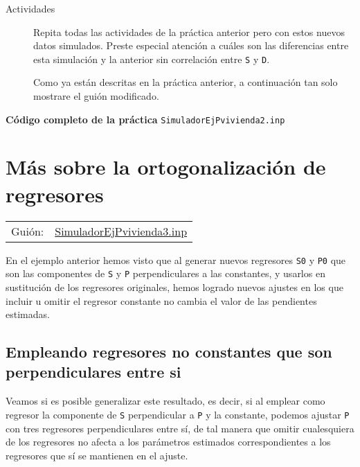 \documentclass[11pt]{article}
\begin{document}
\begin{description}
\item[{Actividades}] Repita todas las actividades de la práctica anterior pero con estos
nuevos datos simulados.  Preste especial atención a cuáles son las
diferencias entre esta simulación y la anterior sin correlación
entre \texttt{S} y \texttt{D}.

Como ya están descritas en la práctica anterior, a continuación tan solo mostrare el guión modificado.
\end{description}
\clearpage
\noindent
\textbf{Código completo de la práctica} \texttt{SimuladorEjPvivienda2.inp}
\vspace{10pt}

\clearpage


\section{Más sobre la ortogonalización de regresores}
\label{sec:org35c3827}
\begin{center}
\begin{tabular}{ll}
Guión: & \href{https://github.com/mbujosab/Ectr/tree/master/Practicas/Gretl/scripts/SimuladorEjPvivienda3.inp}{SimuladorEjPvivienda3.inp}\\[0pt]
\end{tabular}
\end{center}

En el ejemplo anterior hemos visto que al generar nuevos regresores
\texttt{S0} y \texttt{P0} que son las componentes de \texttt{S} y \texttt{P} perpendiculares a las
constantes, y usarlos en sustitución de los regresores originales,
hemos logrado nuevos ajustes en los que incluir u omitir el regresor
constante no cambia el valor de las pendientes estimadas.

\subsection{Empleando regresores no constantes que son perpendiculares entre si}
\label{sec:org24a0da6}

Veamos si es posible generalizar este resultado, es decir, si al
emplear como regresor la componente de \texttt{S} perpendicular a \texttt{P} y la
constante, podemos ajustar \texttt{P} con tres regresores perpendiculares
entre sí, de tal manera que omitir cualesquiera de los regresores no
afecta a los parámetros estimados correspondientes a los regresores
que sí se mantienen en el ajuste.
\end{document}
